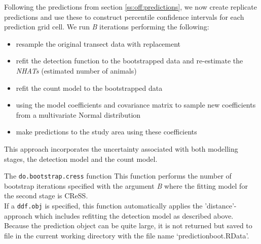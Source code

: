 \label{ss:off:bootstrap}
\noindent Following the predictions from section \ref{ss:off:predictions}, we now create replicate predictions and use these to construct percentile confidence intervals for each prediction grid cell. We run \textit{B} iterations performing the following: 
\begin{itemize}
\item{resample the original transect data with replacement}
\item{refit the detection function to the bootstrapped data and re-estimate the \textit{NHATs} (estimated number of animals)}
\item{refit the count model to the bootstrapped data}
\item{using the model coefficients and covariance matrix to sample new coefficients from a multivariate Normal distribution}
\item{make predictions to the study area using these coefficients}
\end{itemize}
\begin{block}{}
This approach incorporates the uncertainty associated with both modelling stages, the detection model and the count model. 
\end{block}

\begin{block}{The {\tt do.bootstrap.cress} function}
This function performs the number of bootstrap iterations specified with the argument \textit{B} where the fitting model for the second stage is CReSS. \\

If a {\tt ddf.obj} is specified, this function automatically applies the 'distance'-approach which includes refitting the detection model as described above.\\

Because the prediction object can be quite large, it is not returned but saved to file in the current working directory with the file name `predictionboot.RData'. 
\end{block}

\begin{knitrout}\footnotesize
{}\color{fgcolor}
\end{knitrout}


